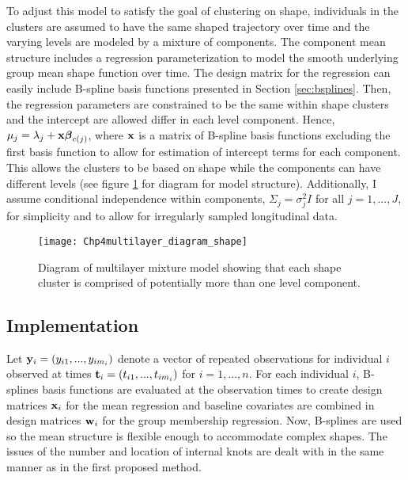 To adjust this model to satisfy the goal of clustering on shape, individuals in the clusters are assumed to have the same shaped trajectory over time and the varying levels are modeled by a mixture of components. The component mean structure includes a regression parameterization to model the smooth underlying group mean shape function over time. The design matrix for the regression can easily include B-spline basis functions presented in Section \ref{sec:bsplines}. Then, the regression parameters are constrained to be the same within shape clusters and the intercept are allowed differ in each level component. Hence, $\mu_{j}=\lambda_{j}+\mathbf x \boldsymbol\beta_{c(j)}$, where $\mathbf x$ is a matrix of B-spline basis functions excluding the first basis function to allow for estimation of intercept terms for each component. This allows the clusters to be based on shape while the components can have different levels (see figure \ref{fig:diashape} for diagram for model structure). Additionally, I assume conditional independence within components, $\Sigma_{j}=\sigma^{2}_{j}I$ for all $j=1,...,J$,  for simplicity and to allow for irregularly sampled longitudinal data.
\begin{figure}[h]
\centering
\texttt{[image: Chp4multilayer\_diagram\_shape]}
\label{fig:diashape}
\caption{Diagram of multilayer mixture model showing that each shape cluster is comprised of potentially more than one level component.}
\end{figure}

\subsection{Implementation}
Let $\mathbf y_{i}=(y_{i1},...,y_{im_{i}})$ denote a vector of repeated observations for individual $i$ observed at times $\mathbf t_{i}=(t_{i1},...,t_{im_{i}})$  for $i=1,...,n$. For each individual $i$, B-splines basis functions are evaluated at the observation times to create design matrices $\mathbf x_{i}$ for the mean regression and baseline covariates are combined in design matrices $\mathbf w_{i}$ for the group membership regression. Now, B-splines are used so the mean structure is flexible enough to accommodate complex shapes. The issues of the number and location of internal knots are dealt with in the same manner as in the first proposed method.

